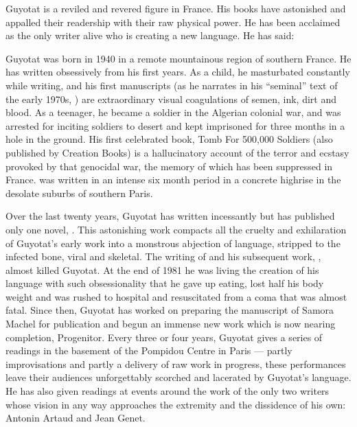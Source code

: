 \documentclass[10pt,twoside]{memoir}
\begin{document}
Guyotat is a reviled and revered figure in France. His books have astonished and appalled their
readership with their raw physical power. He has been acclaimed as the only writer alive who is
creating a new language. He has said: 

Guyotat was born in 1940 in a remote mountainous region of southern France. He has written
obsessively from his first years. As a child, he masturbated constantly while writing, and his first
manuscripts (as he narrates in his \enquote{seminal} text of the early 1970s, ) are extraordinary visual coagulations of semen, ink, dirt and blood. As a
teenager, he became a soldier in the Algerian colonial war, and was arrested for inciting soldiers
to desert and kept imprisoned for three months in a hole in the ground. His first celebrated book,
Tomb For 500,000 Soldiers (also published by Creation Books) is a hallucinatory account of the
terror and ecstasy provoked by that genocidal war, the memory of which has been suppressed in
France.  was written in an intense six month period in a concrete highrise
in the desolate suburbs of southern Paris.

Over the last twenty years, Guyotat has written incessantly but has published only one novel,
. This astonishing work compacts all the cruelty and exhilaration of Guyotat's
early work into a monstrous abjection of language, stripped to the infected bone, viral and
skeletal. The writing of  and his subsequent work, , almost killed Guyotat. At the end of 1981 he was living the creation of his language
with such obsessionality that he gave up eating, lost half his body weight and was rushed to
hospital and resuscitated from a coma that was almost fatal. Since then, Guyotat has worked on
preparing the manuscript of Samora Machel for publication and begun an immense new work which is now
nearing completion, Progenitor. Every three or four years, Guyotat gives a series of readings in the
basement of the Pompidou Centre in Paris --- partly improvisations and partly a delivery of raw work
in progress, these performances leave their audiences unforgettably scorched and lacerated by
Guyotat's language. He has also given readings at events around the work of the only two writers
whose vision in any way approaches the extremity and the dissidence of his own: Antonin Artaud and
Jean Genet.
\end{document}
